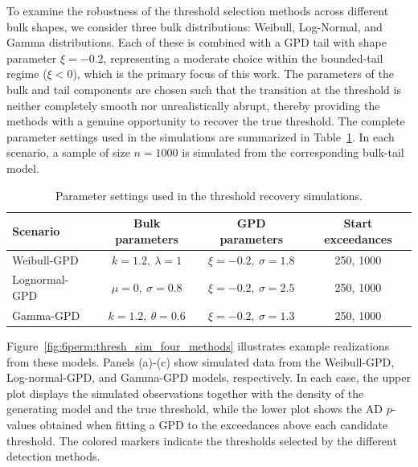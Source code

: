 To examine the robustness of the threshold selection methods across different bulk shapes, we consider three bulk distributions: Weibull, Log-Normal, and Gamma distributions. Each of these is combined with a GPD tail with shape parameter $\xi=-0.2$, representing a moderate choice within the bounded-tail regime ($\xi<0$), which is the primary focus of this work. The parameters of the bulk and tail components are chosen such that the transition at the threshold is neither completely smooth nor unrealistically abrupt, thereby providing the methods with a genuine opportunity to recover the true threshold. The complete parameter settings used in the simulations are summarized in Table~\ref{tab:threshold_sim_settings}. In each scenario, a sample of size $n=1000$ is simulated from the corresponding bulk-tail model.

\begin{table}[t]
\centering
\setlength{\tabcolsep}{12pt}
\caption{Parameter settings used in the threshold recovery simulations.}
\label{tab:threshold_sim_settings}
\begin{tabular}{lccc}
\hline
Scenario & Bulk parameters & GPD parameters & Start exceedances \\
\hline
Weibull-GPD   & $k=1.2,\ \lambda=1$      & $\xi=-0.2,\ \sigma=1.8$ & 250, 1000 \\
Lognormal-GPD & $\mu=0,\ \sigma=0.8$     & $\xi=-0.2,\ \sigma=2.5$ & 250, 1000 \\
Gamma-GPD     & $k=1.2,\ \theta=0.6$     & $\xi=-0.2,\ \sigma=1.3$ & 250, 1000 \\
\hline
\end{tabular}
\end{table}


Figure~\ref{fig:6perm:thresh_sim_four_methods} illustrates example realizations from these models. Panels (a)-(c) show simulated data from the Weibull-GPD, Log-normal-GPD, and Gamma-GPD models, respectively. 
In each case, the upper plot displays the simulated observations together with the density of the generating model and the true threshold, while the lower plot shows the AD $p$-values obtained when fitting a GPD to the exceedances above each candidate threshold. The colored markers indicate the thresholds selected by the different detection methods.

